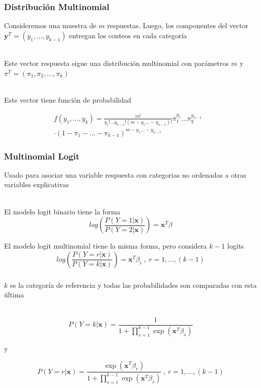 \documentclass[]{beamer}
\begin{document}
\begin{frame}
	\frametitle{Distribución Multinomial}

	Consideremos una muestra de $m$ respuestas. Luego, los componentes del vector 
	$\mathbf{y}^T=(y_1,\ldots , y_{k-1})$ entregan los conteos en cada categoría\\~\  

	Este vector respuesta sigue una distribución multinomial con parámetros $m$ y 
	$\pi^T=(\pi_1,\pi_2,\ldots ,\pi_k)$	\\~\  

	Este vector tiene función de probabilidad 

	\begin{align*}
		f(y_1,\ldots ,y_k)=\frac{m!}{y_1!\ldots y_{k-1}!(m-y_1\ldots -y_{k-1})!}\pi_1^{y_1}\ldots \pi_q^{y_{k-1}} &\\ 
		\cdot(1-\pi_1-\ldots -\pi_{k-1})^{m-y_1\ldots -y_{k-1}} &
	\end{align*}

\end{frame}


\begin{frame}
	\frametitle{Multinomial Logit}

	Usado para asociar una variable respuesta con categorias no ordenadas a 
	otras variables explicativas \\~\  
	
	El modelo logit binario tiene la forma 
	$$log\left(\frac{P(Y=1|\mathbf{x})}{P(Y=2|\mathbf{x})}\right) = \mathbf{x}^T\beta $$

	El modelo logit multinomial tiene la misma forma, pero considera $k-1$ logits
	$$log\left(\frac{P(Y=r|\mathbf{x})}{P(Y=k|\mathbf{x})}\right) = \mathbf{x}^T\beta_r \ , \ r=1,\ldots ,(k-1)$$
	
\end{frame}

\begin{frame}
	\frametitle{}
	$k$ es la categoría de referencia y todas las probabilidades son comparadas 
	con esta última\\~\  

	$$P(Y=k|\mathbf{x})=\frac{1}{1+\prod_{s=1}^{k-1}\exp(\mathbf{x}^T\beta_s)}$$

	y

	$$P(Y=r|\mathbf{x})=\frac{\exp(\mathbf{x}^T\beta_r)}{1+\prod_{s=1}^{k-1}\exp(\mathbf{x}^T\beta_s)} \ , \ r=1,\ldots ,(k-1)$$

\end{frame}
\end{document}
